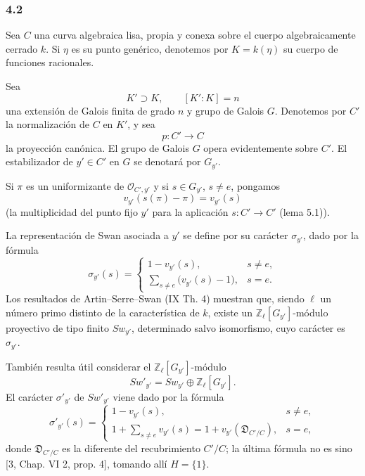 \subsubsection*{4.2}

Sea $C$ una curva algebraica lisa, propia y conexa sobre el cuerpo algebraicamente cerrado $k$. Si $\eta$ es su punto genérico, denotemos por $K=k(\eta)$ su cuerpo de funciones racionales.

Sea
\[
K'\supset K,\qquad [K':K]=n
\]
una extensión de Galois finita de grado $n$ y grupo de Galois $G$. Denotemos por $C'$ la normalización de $C$ en $K'$, y sea
\[
p:C'\longrightarrow C
\]
la proyección canónica. El grupo de Galois $G$ opera evidentemente sobre $C'$. El estabilizador de $y'\in C'$ en $G$ se denotará por $G_{y'}$.

Si $\pi$ es un uniformizante de $\mathcal O_{C',y'}$ y si $s\in G_{y'}$, $s\ne e$, pongamos
\[
v_{y'}(s(\pi)-\pi)=v_{y'}(s)
\tag{4.2.1}
\]
(la multiplicidad del punto fijo $y'$ para la aplicación $s:C'\to C'$ (lema 5.1)).%

La representación de Swan asociada a $y'$ se define por su carácter $\sigma_{y'}$, dado por la fórmula
\[
\sigma_{y'}(s)=
\begin{cases}
1-v_{y'}(s),& s\ne e,\\[0.4em]
\displaystyle\sum_{s\ne e}\bigl(v_{y'}(s)-1\bigr),& s=e.
\end{cases}
\tag{4.2.2}
\]
Los resultados de Artin--Serre--Swan (IX Th. 4) muestran que, siendo $\ell$ un número primo distinto de la característica de $k$, existe un $\mathbb Z_\ell[G_{y'}]$-módulo proyectivo de tipo finito $Sw_{y'}$, determinado salvo isomorfismo, cuyo carácter es $\sigma_{y'}$.

También resulta útil considerar el $\mathbb Z_\ell[G_{y'}]$-módulo
\[
Sw'_{y'}=Sw_{y'}\oplus\mathbb Z_\ell[G_{y'}].
\tag{4.2.3}
\]
El carácter $\sigma'_{y'}$ de $Sw'_{y'}$ viene dado por la fórmula
\[
\sigma'_{y'}(s)=
\begin{cases}
1-v_{y'}(s),& s\ne e,\\[0.4em]
\displaystyle 1+\sum_{s\ne e}v_{y'}(s)
=1+v_{y'}(\mathfrak D_{C'/C}),& s=e,
\end{cases}
\tag{4.2.4}
\]
donde $\mathfrak D_{C'/C}$ es la diferente del recubrimiento $C'/C$; la última fórmula no es sino [3, Chap. VI 2, prop. 4], tomando allí $H=\{1\}$.

